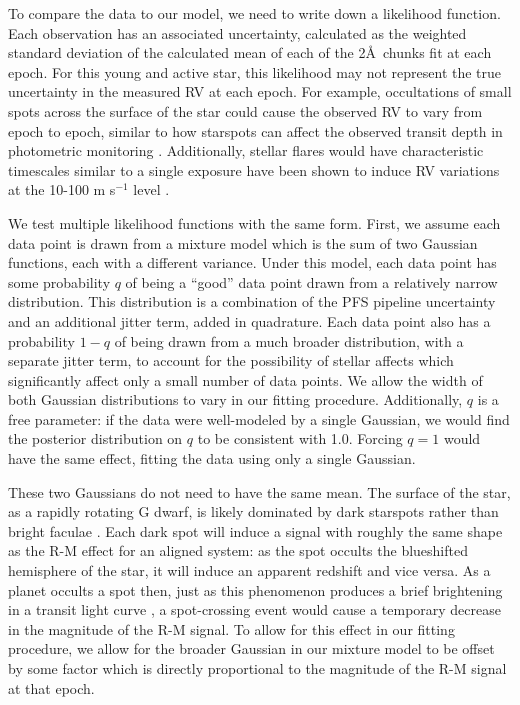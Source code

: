 \documentclass[twocolumn]{aastex63}
\begin{document}
To compare the data to our model, we need to write down a likelihood function. 
Each observation has an associated uncertainty, calculated as the weighted standard deviation of the calculated mean of each of the 2\AA\ chunks fit at each epoch.
For this young and active star, this likelihood may not represent the true uncertainty in the measured RV at each epoch. 
For example, occultations of small spots across the surface of the star could cause the observed RV to vary from epoch to epoch, similar to how starspots can affect the observed transit depth in photometric monitoring \citep{SanchisOjeda13}.
Additionally, stellar flares would have characteristic timescales similar to a single exposure have been shown to induce RV variations at the 10-100 m s$^{-1}$ level \citep{Reiners09}.

We test multiple likelihood functions with the same form.
First, we assume each data point is drawn from a mixture model which is the sum of two Gaussian functions, each with a different variance.
Under this model, each data point has some probability $q$ of being a ``good'' data point drawn from a relatively narrow distribution. This distribution is a combination of the PFS pipeline uncertainty and an additional jitter term, added in quadrature. 
Each data point also has a probability $1-q$ of being drawn from a much broader distribution, with a separate jitter term, to account for the possibility of stellar affects which significantly affect only a small number of data points. We allow the width of both Gaussian distributions to vary in our fitting procedure. 
Additionally, $q$ is a free parameter: if the data were well-modeled by a single Gaussian, we would find the posterior distribution on $q$ to be consistent with 1.0.
Forcing $q=1$ would have the same effect, fitting the data using only a single Gaussian.

These two Gaussians do not need to have the same mean. 
The surface of the star, as a rapidly rotating G dwarf, is likely dominated by dark starspots rather than bright faculae \citep{Montet17}. 
Each dark spot will induce a signal with roughly the same shape as the R-M effect for an aligned system: as the spot occults the blueshifted hemisphere of the star, it will induce an apparent redshift and vice versa.
As a planet occults a spot then, just as this phenomenon produces a brief brightening in a transit light curve \citep{Desert11, SanchisOjeda13, Morris17}, a spot-crossing event would cause a temporary decrease in the magnitude of the R-M signal. 
To allow for this effect in our fitting procedure, we allow for the broader Gaussian in our mixture model to be offset by some factor which is directly proportional to the magnitude of the R-M signal at that epoch. 
\end{document}
